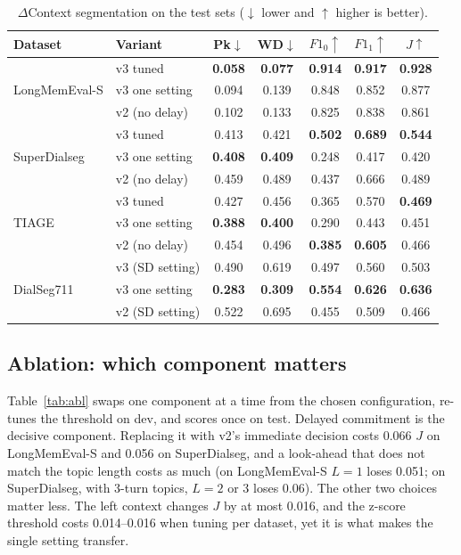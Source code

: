 \documentclass[journal]{IEEEtran}
\newcommand{\dc}{$\Delta$Context}
\begin{document}
\begin{table}[t]
\centering
\caption{\dc{} segmentation on the test sets ($\downarrow$ lower and $\uparrow$ higher is better).}
\label{tab:ours}
\footnotesize
\setlength{\tabcolsep}{3.2pt}
\begin{tabular}{@{}llccccc@{}}
\toprule
Dataset & Variant & Pk$\downarrow$ & WD$\downarrow$ & $F1_0\uparrow$ & $F1_1\uparrow$ & $J\uparrow$ \\
\midrule
\multirow{3}{*}{LongMemEval-S} & v3 tuned & \textbf{0.058} & \textbf{0.077} & \textbf{0.914} & \textbf{0.917} & \textbf{0.928} \\
 & v3 one setting & 0.094 & 0.139 & 0.848 & 0.852 & 0.877 \\
 & v2 (no delay) & 0.102 & 0.133 & 0.825 & 0.838 & 0.861 \\
\midrule
\multirow{3}{*}{SuperDialseg} & v3 tuned & 0.413 & 0.421 & \textbf{0.502} & \textbf{0.689} & \textbf{0.544} \\
 & v3 one setting & \textbf{0.408} & \textbf{0.409} & 0.248 & 0.417 & 0.420 \\
 & v2 (no delay) & 0.459 & 0.489 & 0.437 & 0.666 & 0.489 \\
\midrule
\multirow{3}{*}{TIAGE} & v3 tuned & 0.427 & 0.456 & 0.365 & 0.570 & \textbf{0.469} \\
 & v3 one setting & \textbf{0.388} & \textbf{0.400} & 0.290 & 0.443 & 0.451 \\
 & v2 (no delay) & 0.454 & 0.496 & \textbf{0.385} & \textbf{0.605} & 0.466 \\
\midrule
\multirow{3}{*}{DialSeg711} & v3 (SD setting) & 0.490 & 0.619 & 0.497 & 0.560 & 0.503 \\
 & v3 one setting & \textbf{0.283} & \textbf{0.309} & \textbf{0.554} & \textbf{0.626} & \textbf{0.636} \\
 & v2 (SD setting) & 0.522 & 0.695 & 0.455 & 0.509 & 0.466 \\
\bottomrule
\end{tabular}
\end{table}

\subsection{Ablation: which component matters}
Table~\ref{tab:abl} swaps one component at a time from the chosen
configuration, re-tunes the threshold on dev, and scores once on test. Delayed
commitment is the decisive component. Replacing it with v2's immediate
decision costs 0.066 $J$ on LongMemEval-S and 0.056 on SuperDialseg, and a
look-ahead that does not match the topic length costs as much (on
LongMemEval-S $L{=}1$ loses 0.051; on SuperDialseg, with 3-turn topics, $L{=}2$
or $3$ loses 0.06). The other two choices matter less. The left context changes $J$ by at
most 0.016, and the z-score threshold costs 0.014--0.016 when tuning per
dataset, yet it is what makes the single setting transfer.
\end{document}
